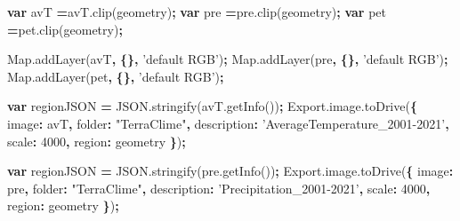 \documentclass[
  10pt,
  b5paper,
]{book}
\newenvironment{Shaded}{\begin{snugshade}}{\end{snugshade}}
\newcommand{\AttributeTok}[1]{\textcolor[rgb]{0.77,0.63,0.00}{#1}}
\newcommand{\DataTypeTok}[1]{\textcolor[rgb]{0.13,0.29,0.53}{#1}}
\newcommand{\DecValTok}[1]{\textcolor[rgb]{0.00,0.00,0.81}{#1}}
\newcommand{\KeywordTok}[1]{\textcolor[rgb]{0.13,0.29,0.53}{\textbf{#1}}}
\newcommand{\NormalTok}[1]{#1}
\newcommand{\OperatorTok}[1]{\textcolor[rgb]{0.81,0.36,0.00}{\textbf{#1}}}
\newcommand{\StringTok}[1]{\textcolor[rgb]{0.31,0.60,0.02}{#1}}
\newcommand{\VariableTok}[1]{\textcolor[rgb]{0.00,0.00,0.00}{#1}}
\begin{document}
\begin{Shaded}
\begin{Highlighting}[]
\KeywordTok{var}\NormalTok{ avT }\OperatorTok{=}\VariableTok{avT}\NormalTok{.}\AttributeTok{clip}\NormalTok{(geometry)}\OperatorTok{;}
\KeywordTok{var}\NormalTok{ pre }\OperatorTok{=}\VariableTok{pre}\NormalTok{.}\AttributeTok{clip}\NormalTok{(geometry)}\OperatorTok{;}
\KeywordTok{var}\NormalTok{ pet }\OperatorTok{=}\VariableTok{pet}\NormalTok{.}\AttributeTok{clip}\NormalTok{(geometry)}\OperatorTok{;}



\VariableTok{Map}\NormalTok{.}\AttributeTok{addLayer}\NormalTok{(avT}\OperatorTok{,} \OperatorTok{\{\},} \StringTok{'default RGB'}\NormalTok{)}\OperatorTok{;}
\VariableTok{Map}\NormalTok{.}\AttributeTok{addLayer}\NormalTok{(pre}\OperatorTok{,} \OperatorTok{\{\},} \StringTok{'default RGB'}\NormalTok{)}\OperatorTok{;}
\VariableTok{Map}\NormalTok{.}\AttributeTok{addLayer}\NormalTok{(pet}\OperatorTok{,} \OperatorTok{\{\},} \StringTok{'default RGB'}\NormalTok{)}\OperatorTok{;}



\KeywordTok{var}\NormalTok{ regionJSON }\OperatorTok{=} \VariableTok{JSON}\NormalTok{.}\AttributeTok{stringify}\NormalTok{(}\VariableTok{avT}\NormalTok{.}\AttributeTok{getInfo}\NormalTok{())}\OperatorTok{;}
\VariableTok{Export}\NormalTok{.}\VariableTok{image}\NormalTok{.}\AttributeTok{toDrive}\NormalTok{(}\OperatorTok{\{}
          \DataTypeTok{image}\OperatorTok{:}\NormalTok{ avT}\OperatorTok{,}
          \DataTypeTok{folder}\OperatorTok{:} \StringTok{"TerraClime"}\OperatorTok{,}
          \DataTypeTok{description}\OperatorTok{:} \StringTok{'AverageTemperature_2001-2021'}\OperatorTok{,} 
          \DataTypeTok{scale}\OperatorTok{:} \DecValTok{4000}\OperatorTok{,}
          \DataTypeTok{region}\OperatorTok{:}\NormalTok{ geometry}
\OperatorTok{\}}\NormalTok{)}\OperatorTok{;}

\KeywordTok{var}\NormalTok{ regionJSON }\OperatorTok{=} \VariableTok{JSON}\NormalTok{.}\AttributeTok{stringify}\NormalTok{(}\VariableTok{pre}\NormalTok{.}\AttributeTok{getInfo}\NormalTok{())}\OperatorTok{;}
\VariableTok{Export}\NormalTok{.}\VariableTok{image}\NormalTok{.}\AttributeTok{toDrive}\NormalTok{(}\OperatorTok{\{}
          \DataTypeTok{image}\OperatorTok{:}\NormalTok{ pre}\OperatorTok{,}
          \DataTypeTok{folder}\OperatorTok{:} \StringTok{"TerraClime"}\OperatorTok{,}
          \DataTypeTok{description}\OperatorTok{:} \StringTok{'Precipitation_2001-2021'}\OperatorTok{,} 
          \DataTypeTok{scale}\OperatorTok{:} \DecValTok{4000}\OperatorTok{,}
          \DataTypeTok{region}\OperatorTok{:}\NormalTok{ geometry}
\OperatorTok{\}}\NormalTok{)}\OperatorTok{;}


\end{Highlighting}
\end{Shaded}
\end{document}
